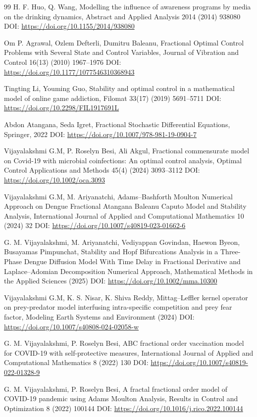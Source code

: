\documentclass[10pt]{NSP1}
\begin{document}
\begin{thebibliography}{99}
H. F. Huo, Q. Wang, Modelling the influence of awareness programs by media on the drinking dynamics, Abstract and Applied Analysis 2014 (2014) 938080 DOI: \url{https://doi.org/10.1155/2014/938080}

Om P. Agrawal, Ozlem Defterli, Dumitru Baleanu, Fractional Optimal Control Problems with Several State and Control Variables, Journal of Vibration and Control 16(13) (2010) 1967--1976 DOI: \url{https://doi.org/10.1177/1077546310368943}

Tingting Li, Youming Guo, Stability and optimal control in a mathematical model of online game addiction, Filomat 33(17) (2019) 5691–5711 DOI: \url{https://doi.org/10.2298/FIL1917691L}

Abdon Atangana, Seda Igret, Fractional Stochastic Differential Equations, Springer, 2022 DOI: \url{https://doi.org/10.1007/978-981-19-0904-7}

Vijayalakshmi G.M, P. Roselyn Besi, Ali Akgul, Fractional commensurate model on Covid-19 with microbial coinfections: An optimal control analysis, Optimal Control Applications and Methods 45(4) (2024) 3093--3112 DOI: \url{https://doi.org/10.1002/oca.3093}

Vijayalakshmi G.M, M. Ariyanatchi, Adams–Bashforth Moulton Numerical Approach on Dengue Fractional Atangana Baleanu Caputo Model and Stability Analysis, International Journal of Applied and Computational Mathematics 10 (2024) 32 DOI: \url{https://doi.org/10.1007/s40819-023-01662-6}

G. M. Vijayalakshmi, M. Ariyanatchi, Vediyappan Govindan, Haewon Byeon, Busayamas Pimpunchat, Stability and Hopf Bifurcations Analysis in a Three-Phase Dengue Diffusion Model With Time Delay in Fractional Derivative and Laplace–Adomian Decomposition Numerical Approach, Mathematical Methods in the Applied Sciences (2025) DOI: \url{https://doi.org/10.1002/mma.10300}

Vijayalakshmi G.M, K. S. Nisar, K. Shiva Reddy, Mittag–Leffler kernel operator on prey-predator model interfusing intra-specific competition and prey fear factor, Modeling Earth Systems and Environment (2024) DOI: \url{https://doi.org/10.1007/s40808-024-02058-w}

G. M. Vijayalakshmi, P. Roselyn Besi, ABC fractional order vaccination model for COVID-19 with self-protective measures, International Journal of Applied and Computational Mathematics 8 (2022) 130 DOI: \url{https://doi.org/10.1007/s40819-022-01328-9}

G. M. Vijayalakshmi, P. Roselyn Besi, A fractal fractional order model of COVID-19 pandemic using Adams Moulton Analysis, Results in Control and Optimization 8 (2022) 100144 DOI: \url{https://doi.org/10.1016/j.rico.2022.100144}
\end{thebibliography}
	
\end{document}
